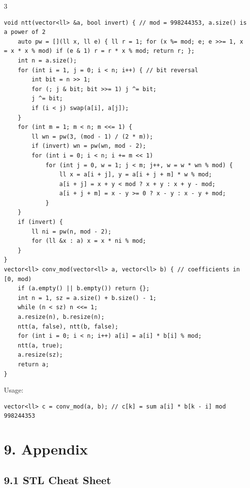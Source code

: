 \documentclass[8pt]{extarticle}
\begin{document}
\begin{multicols*}{3}
\begin{lstlisting}
void ntt(vector<ll> &a, bool invert) { // mod = 998244353, a.size() is a power of 2
    auto pw = [](ll x, ll e) { ll r = 1; for (x %= mod; e; e >>= 1, x = x * x % mod) if (e & 1) r = r * x % mod; return r; };
    int n = a.size();
    for (int i = 1, j = 0; i < n; i++) { // bit reversal
        int bit = n >> 1;
        for (; j & bit; bit >>= 1) j ^= bit;
        j ^= bit;
        if (i < j) swap(a[i], a[j]);
    }
    for (int m = 1; m < n; m <<= 1) {
        ll wn = pw(3, (mod - 1) / (2 * m));
        if (invert) wn = pw(wn, mod - 2);
        for (int i = 0; i < n; i += m << 1)
            for (int j = 0, w = 1; j < m; j++, w = w * wn % mod) {
                ll x = a[i + j], y = a[i + j + m] * w % mod;
                a[i + j] = x + y < mod ? x + y : x + y - mod;
                a[i + j + m] = x - y >= 0 ? x - y : x - y + mod;
            }
    }
    if (invert) {
        ll ni = pw(n, mod - 2);
        for (ll &x : a) x = x * ni % mod;
    }
}
vector<ll> conv_mod(vector<ll> a, vector<ll> b) { // coefficients in [0, mod)
    if (a.empty() || b.empty()) return {};
    int n = 1, sz = a.size() + b.size() - 1;
    while (n < sz) n <<= 1;
    a.resize(n), b.resize(n);
    ntt(a, false), ntt(b, false);
    for (int i = 0; i < n; i++) a[i] = a[i] * b[i] % mod;
    ntt(a, true);
    a.resize(sz);
    return a;
}
\end{lstlisting}

Usage:

\begin{lstlisting}
vector<ll> c = conv_mod(a, b); // c[k] = sum a[i] * b[k - i] mod 998244353
\end{lstlisting}

\section*{9. Appendix}

\subsection*{9.1 STL Cheat Sheet}


\end{multicols*}
\end{document}
